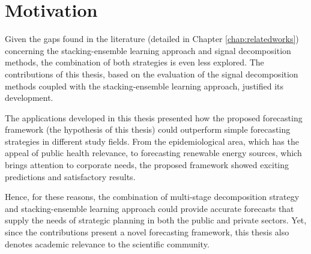 \section{Motivation} \label{sec:motivation}

Given the gaps found in the literature (detailed in Chapter \ref{chap:relatedworks}) concerning the stacking-ensemble learning approach and signal decomposition methods, the combination of both strategies is even less explored. The contributions of this thesis, based on the evaluation of the signal decomposition methods coupled with the stacking-ensemble learning approach, justified its development.

The applications developed in this thesis presented how the proposed forecasting framework (the hypothesis of this thesis) could outperform simple forecasting strategies in different study fields. From the epidemiological area, which has the appeal of public health relevance, to forecasting renewable energy sources, which brings attention to corporate needs, the proposed framework showed exciting predictions and satisfactory results.

Hence, for these reasons, the combination of multi-stage decomposition strategy and stacking-ensemble learning approach could provide accurate forecasts that supply the needs of strategic planning in both the public and private sectors. Yet, since the contributions present a novel forecasting framework, this thesis also denotes academic relevance to the scientific community.